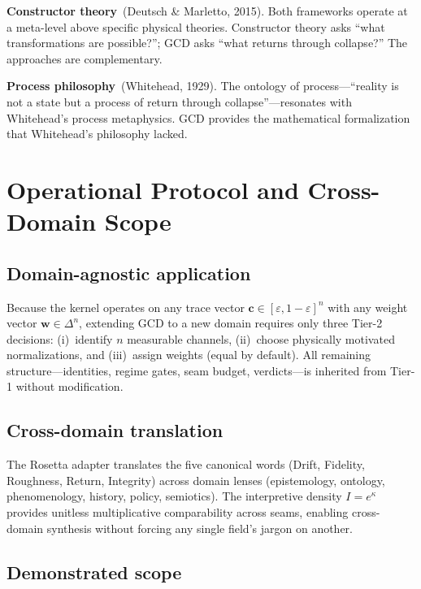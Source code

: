 \documentclass[
  aps,
  prd,
  twocolumn,
  superscriptaddress,
  nofootinbib,
  floatfix
]{revtex4-2}
\newcommand{\eps}{\varepsilon}
\begin{document}
\textbf{Constructor theory}~(Deutsch \& Marletto, 2015).  Both
frameworks operate at a meta-level above specific physical theories.
Constructor theory asks ``what transformations are possible?''; GCD
asks ``what returns through collapse?''  The approaches are
complementary.

\textbf{Process philosophy}~(Whitehead, 1929).  The ontology of
process---``reality is not a state but a process of return through
collapse''---resonates with Whitehead's process metaphysics.  GCD
provides the mathematical formalization that Whitehead's philosophy
lacked.

\section{Operational Protocol and Cross-Domain Scope}
\label{sec:protocol}

\subsection{Domain-agnostic application}

Because the kernel operates on any trace vector
$\mathbf{c} \in [\eps, 1{-}\eps]^n$ with any weight vector
$\mathbf{w} \in \Delta^n$, extending GCD to a new domain requires
only three Tier-2 decisions: (i)~identify $n$ measurable channels,
(ii)~choose physically motivated normalizations, and
(iii)~assign weights (equal by default).  All remaining
structure---identities, regime gates, seam budget, verdicts---is
inherited from Tier-1 without modification.

\subsection{Cross-domain translation}

The Rosetta adapter translates the five canonical words (Drift,
Fidelity, Roughness, Return, Integrity) across domain lenses
(epistemology, ontology, phenomenology, history, policy, semiotics).
The interpretive density $I = e^\kappa$ provides unitless
multiplicative comparability across seams, enabling cross-domain
synthesis without forcing any single field's jargon on another.

\subsection{Demonstrated scope}
\end{document}
